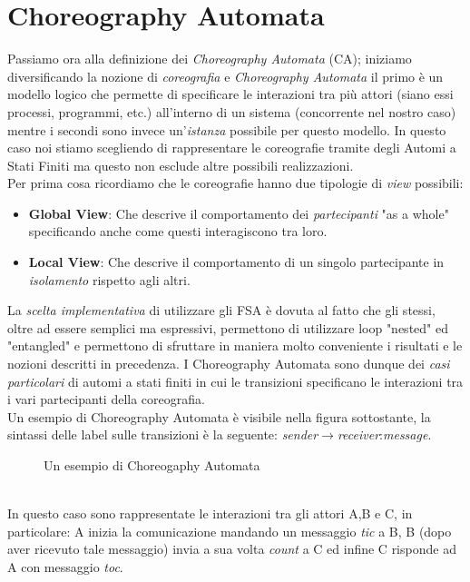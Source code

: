 \section{Choreography Automata}
Passiamo ora alla definizione dei \emph{Choreography Automata} (CA); iniziamo diversificando la nozione di \emph{coreografia} e \emph{Choreography Automata}\cite{Choreography_Automata} il primo è un modello logico che permette di specificare le interazioni tra più attori (siano essi processi, programmi, etc.) all'interno di un sistema (concorrente nel nostro caso) mentre i secondi sono invece un'\emph{istanza} possibile per questo modello. In questo caso noi stiamo scegliendo di rappresentare le coreografie tramite degli Automi a Stati Finiti ma questo non esclude altre possibili realizzazioni.\\
Per prima cosa ricordiamo che le coreografie hanno due tipologie di \emph{view} possibili:
\begin{itemize}
    \item \textbf{Global View}: Che descrive il comportamento dei \emph{partecipanti} "as a whole" specificando anche come questi interagiscono tra loro.
    \item \textbf{Local View}: Che descrive il comportamento di un singolo partecipante in \emph{isolamento} rispetto agli altri.
\end{itemize}
La \emph{scelta implementativa} di utilizzare gli FSA è dovuta al fatto che gli stessi, oltre ad essere semplici ma espressivi, permettono di utilizzare loop "nested" ed "entangled" e permettono di sfruttare in maniera molto conveniente i risultati e le nozioni descritti in precedenza. I Choreography Automata sono dunque dei \emph{casi particolari} di automi a stati finiti in cui le transizioni specificano le interazioni tra i vari partecipanti della coreografia.\\
Un esempio di Choreography Automata è visibile nella figura sottostante, la sintassi delle label sulle transizioni è la seguente: \emph{sender}$\rightarrow$\emph{receiver}:\emph{message}.
\begin{figure}[ht]
    \centering
    \caption{Un esempio di Choreogaphy Automata}
    \label{fig:ChoreographyAutomata_Example}
\end{figure}\\
In questo caso sono rappresentate le interazioni tra gli attori A,B e C, in particolare: A inizia la comunicazione mandando un messaggio \emph{tic} a B, B (dopo aver ricevuto tale messaggio) invia a sua volta \emph{count} a C ed infine C risponde ad A con messaggio \emph{toc}.

